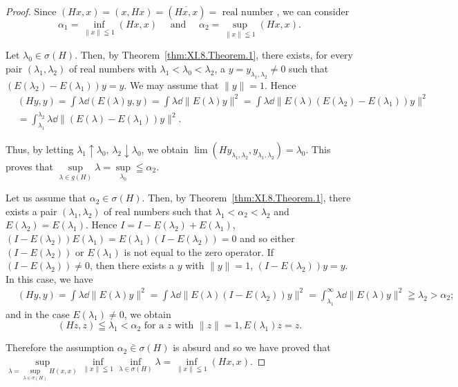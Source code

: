 \begin{proof}
 Since $(Hx, x) = (x, Hx) = (\overline{Hx, x}) = \text{ real number }$, we can consider 
\[
\alpha_{1} = \inf\limits _{\| x \| \leqq 1} (H x, x) \quad \text{ and } \quad \alpha_{2} = \sup\limits _{\| x \| \leqq 1} (H x, x). \]

Let $\lambda_0 \in \sigma(H)$. Then, by Theorem~\ref{thm:XI.8.Theorem.1}, there exists, for every pair $(\lambda_1, \lambda_2)$ of real numbers with $\lambda_1 < \lambda_0 < \lambda_2$, a $y = y_{\lambda_1, \lambda_2} \neq 0$ such that $(E(\lambda_2) - E(\lambda_1))y = y$. We may assume that $\|y\| = 1$. Hence 
\[
\begin{aligned}
&(H y, y)  = \int \lambda \dd (E (\lambda) y, y) = \int \lambda \dd \| E (\lambda) y \| ^{2} = \int \lambda \dd \| E (\lambda) (E (\lambda_{2}) - E (\lambda_{1})) y \| ^{2} \\
&= \int_ {\lambda_{1}} ^ {\lambda_{2}} \lambda \dd \| (E (\lambda) - E (\lambda_{1})) y \| ^{2}.
\end{aligned}
\]

Thus, by letting $\lambda_1 \uparrow \lambda_0$, $\lambda_2 \downarrow \lambda_0$, we obtain $\lim (H y_{\lambda_1, \lambda_2}, y_{\lambda_1, \lambda_2}) = \lambda_0$. This proves that $\sup\limits_{\lambda \in g(H)} \lambda = \sup\limits_{\lambda_0} \leqq \alpha_2$. 

Let us assume that $\alpha_{2} \in \sigma(H)$. Then, by Theorem~\ref{thm:XI.8.Theorem.1}, there exists a pair $(\lambda_{1}, \lambda_{2})$ of real numbers such that $\lambda_{1} < \alpha_{2} < \lambda_{2}$ and $E(\lambda_{2}) = E(\lambda_{1})$. Hence $I = I - E(\lambda_{2}) + E(\lambda_{1})$, $(I - E(\lambda_{2}))E(\lambda_{1}) = E(\lambda_{1})(I - E(\lambda_{2})) = 0$ and so either $(I - E(\lambda_{2}))$ or $E(\lambda_{1})$ is not equal to the zero operator. If $(I - E(\lambda_{2})) \neq 0$, then there exists a $y$ with $\|y\| = 1$, $(I - E(\lambda_{2}))y = y$. In this case, we have 
\[
\begin{aligned}
&(H y, y)  = \int \lambda \dd \| E (\lambda) y \| ^{2} = \int \lambda \dd \| E (\lambda) (I - E (\lambda_{2})) y \| ^{2} = \int_ {\lambda_{1}} ^{\infty} \lambda \dd \| E (\lambda) y \| ^{2} \geqq \lambda_{2} > \alpha_{2};
\end{aligned}
\]
and in the case $E(\lambda_1) \neq 0$, we obtain 
\[
(H z, z) \leqq \lambda_{1} < \alpha_{2} \text{ for a } z \text{ with } \| z \| = 1, E (\lambda_{1}) z = z.
\]

Therefore the assumption $\alpha_{2} \bar{\in} \sigma(H)$ is absurd and so we have proved that $\sup\limits_{\lambda = \sup\limits_{\lambda \in \sigma(H)} H(x, x)} \inf\limits_{\|x\| \leqq 1} \inf\limits_{\lambda \in \sigma(H)} \lambda = \inf\limits_{\|x\| \leqq 1} (Hx, x)$. 
\end{proof}

